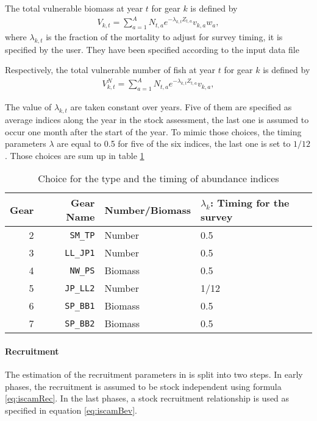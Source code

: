 The total vulnerable biomass at year $t$ for gear $k$ is defined by
\begin{gather}
V_{k,t}=\sum_{a=1}^A N_{t,a} e^{-\lambda_{k,t} Z_{t,a}} v_{k,a} w_a,
\end{gather}
 where $\lambda_{k,t}$ is the fraction  of the mortality to adjust for
 survey timing, it is specified by the user. They have been
 specified according to the input data file 
 
Respectively, the total vulnerable number of fish at year $t$ for gear $k$ is defined by
\begin{gather}
V^{N}_{k,t}=\sum_{a=1}^A N_{t,a} e^{-\lambda_{k,t} Z_{t,a}} v_{k,a},
\end{gather}
 
 
 The value of $\lambda_{k,t}$ are taken constant over years. Five of them are specified as average indices along the year in the stock assessment,
the last one is assumed to occur one month after the start of the year. To mimic those choices, the timing parameters $\lambda$ are equal to 0.5 for five of the six indices, the last one is set to $1/12$. Those choices are sum up in table \ref{table:timing} 
 
 \begin{table}[ht]
\centering
\begin{tabular}{rrp{3.5cm}p{4cm}}
  \hline
  Gear & Gear Name & Number/Biomass & $\lambda_k$: Timing for the survey\\ 
  \hline
2 & \verb+SM_TP+ & Number & 0.5 \\ 	
3 & \verb+LL_JP1+ & Number & 0.5 \\
4 & \verb+NW_PS+ & Biomass & 0.5 \\
5 & \verb+JP_LL2+ & Number & 1/12 \\
6 & \verb+SP_BB1+ & Biomass & 0.5\\
7 & \verb+SP_BB2+ & Biomass &0.5 \\
\hline
\end{tabular}
\caption{Choice for the type and the timing of abundance indices}
\label{table:timing}
\end{table}
 


\paragraph{Recruitment}
The estimation of the recruitment parameters in \iscam  is split into two steps. In early phases, the recruitment is assumed to be stock independent using formula 
\ref{eq:iscamRec}. In the last phases, a stock recruitment relationship is used as specified 
in equation \ref{eq:iscamBev}. 

